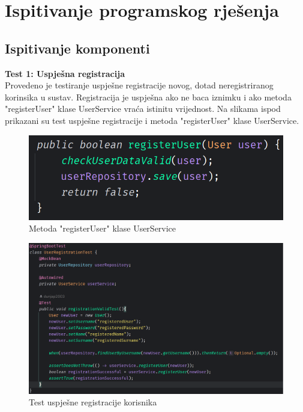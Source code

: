 			
			
		
	
		\section{Ispitivanje programskog rješenja}
			
			\subsection{Ispitivanje komponenti}
\textbf{Test 1: Uspješna registracija} \\
Provedeno je testiranje uspješne registracije novog, dotad neregistriranog korinsika u sustav. Registracija je uspješna ako ne baca iznimku i ako metoda "registerUser" klase UserService vraća istinitu vrijednost. Na slikama ispod prikazani su test uspješne registracije i metoda "registerUser" klase UserService.

		\begin{figure}[H]
			\includegraphics[scale=0.4]{slike/registerUser.PNG} %
			\centering
			\caption{Metoda "registerUser" klase UserService}
			\label{Metoda "registerUser" klase UserService}
		\end{figure}
		
				\begin{figure}[H]
			\includegraphics[scale=0.4]{slike/userRegistrationTest.PNG} %
			\centering
			\caption{Test uspješne registracije korisnika}
			\label{Test uspješne registracije korisnika}
		\end{figure}
		
